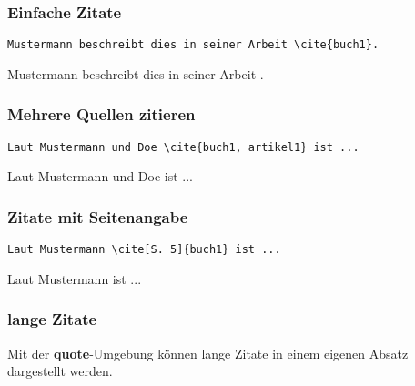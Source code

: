 \subsubsection{Einfache Zitate}

\begin{minipage}[c]{0.48\textwidth}
    \begin{lstlisting}[language={[LaTeX]TeX}]
Mustermann beschreibt dies in seiner Arbeit \cite{buch1}.
    \end{lstlisting}
\end{minipage}
\hfill
\begin{minipage}[c]{0.48\textwidth}
    Mustermann beschreibt dies in seiner Arbeit \cite{buch1}.
\end{minipage}


\subsubsection{Mehrere Quellen zitieren}

\begin{minipage}[c]{0.48\textwidth}
    \begin{lstlisting}[language={[LaTeX]TeX}]
Laut Mustermann und Doe \cite{buch1, artikel1} ist ...
    \end{lstlisting}
\end{minipage}
\hfill
\begin{minipage}[c]{0.48\textwidth}
    Laut Mustermann und Doe \cite{buch1, artikel1} ist ...
\end{minipage}


\subsubsection{Zitate mit Seitenangabe}

\begin{minipage}[c]{0.48\textwidth}
    \begin{lstlisting}[language={[LaTeX]TeX}]
Laut Mustermann \cite[S. 5]{buch1} ist ...
    \end{lstlisting}
\end{minipage}
\hfill
\begin{minipage}[c]{0.48\textwidth}
    Laut Mustermann \cite[S. 5]{buch1} ist ...
\end{minipage}

\newpage

\subsubsection{lange Zitate}
Mit der \textbf{quote}-Umgebung können lange Zitate in einem eigenen Absatz dargestellt werden.

